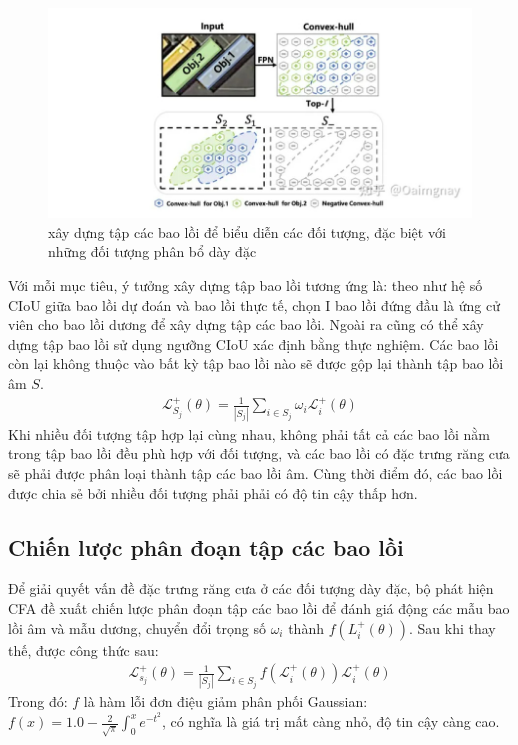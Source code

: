 \documentclass[12pt,a4paper,openany,oneside]{report}
\begin{document}
\begin{figure}[ht!]
	\begin{center}
		\includegraphics[width=445px]{./construction_convex_hull_set.jpg}
		\caption{xây dựng tập các bao lồi để biểu diễn các đối tượng, đặc biệt với những đối tượng phân bổ dày đặc}
		\label{fig_dhandang1}
	\end{center}
\end{figure} 
Với mỗi mục tiêu, ý tưởng xây dựng tập bao lồi tương ứng là: theo như hệ số CIoU giữa bao lồi dự đoán và bao lồi thực tế, chọn I bao lồi đứng đầu là ứng cử viên cho bao lồi dương để xây dựng tập các bao lồi. Ngoài ra cũng có thể xây dựng tập bao lồi sử dụng ngưỡng CIoU xác định bằng thực nghiệm. Các bao lồi còn lại không thuộc vào bất kỳ tập bao lồi nào sẽ được gộp lại thành tập bao lồi âm $S$.
\begin{align} \label{construct_convex_hull_set}
\mathcal{L}_{S_j}^{+}(\theta)=\frac{1}{\left|S_j\right|} \sum_{i \in S_j} \omega_i \mathcal{L}_i^{+}(\theta)
\end{align}
Khi nhiều đối tượng tập hợp lại cùng nhau, không phải tất cả các bao lồi nằm trong tập bao lồi đều phù hợp với đối tượng, và các bao lồi có đặc trưng răng cưa sẽ phải được phân loại thành tập các bao lồi âm. Cùng thời điểm đó, các bao lồi được chia sẻ bởi nhiều đối tượng phải phải có độ tin cậy thấp hơn.
\subsection{Chiến lược phân đoạn tập các bao lồi}
Để giải quyết vấn đề đặc trưng răng cưa ở các đối tượng dày đặc, bộ phát hiện CFA đề xuất chiến lược phân đoạn tập các bao lồi để đánh giá động các mẫu bao lồi âm và mẫu dương, chuyển đổi trọng số $\omega_i$ thành $f\left(L_i^{+}(\theta)\right)$. Sau khi thay thế, được công thức sau:
\begin{align} \label{loss_positive_convert}
	\mathcal{L}_{s_j}^{+}(\theta)=\frac{1}{\left|S_j\right|} \sum_{i \in S_j} f\left(\mathcal{L}_i^{+}(\theta)\right) \mathcal{L}_i^{+}(\theta)
\end{align}
Trong đó: $f$ là hàm lỗi đơn điệu giảm phân phối Gaussian: $f\left(x\right) = 1.0 - \frac{2}{\sqrt{\pi}}\int_0^xe^{-t^2}$, có nghĩa là giá trị mất càng nhỏ, độ tin cậy càng cao.
\end{document}
